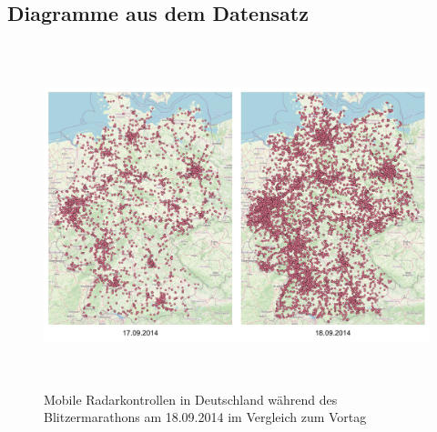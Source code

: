 \subsection{Diagramme aus dem Datensatz}
\label{sec:AnhangDiagramme}

\begin{figure}[h]
    \centering
    \includegraphics[width=1.0\textwidth,height=10cm,keepaspectratio=true]{content/images/BlitzerMarathonSep2014Vgl.jpeg}
    \caption{Mobile Radarkontrollen in Deutschland während des Blitzermarathons am 18.09.2014 im Vergleich zum Vortag}
    \label{fig:BlitzerMarathonSep2014Vgl}
\end{figure}
